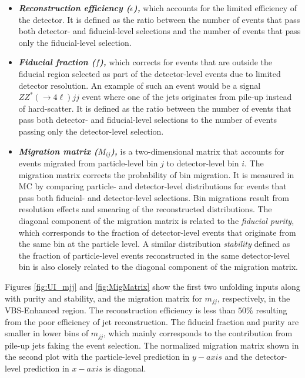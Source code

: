 \begin{itemize}
    \item{\textit{\textbf{Reconstruction efficiency ($\epsilon$),}} which accounts for the limited efficiency of the detector. It is defined as the ratio between the number of events that pass both detector- and fiducial-level selections and the number of events that pass only the fiducial-level selection. }
    
    \item{\textit{\textbf{Fiducial fraction ($f$),}} which corrects for events that are outside the fiducial region selected as part of the detector-level events due to limited detector resolution. An example of such an event would be a signal $ZZ^*(\rightarrow 4\ell) jj$ event where one of the jets originates from pile-up instead of hard-scatter. It is defined as the ratio between the number of events that pass both detector- and fiducial-level selections to the number of events passing only the detector-level selection. }
    
    \item{\textit{\textbf{Migration matrix ($M_{ij}$),}} is a two-dimensional matrix that accounts for events migrated from particle-level bin $j$ to detector-level bin $i$. The migration matrix corrects the probability of bin migration. It is measured in MC by comparing particle- and detector-level distributions for events that pass both fiducial- and detector-level selections. Bin migrations result from resolution effects and smearing of the reconstructed distributions. The diagonal component of the migration matrix is related to the \textit{fiducial purity}, which corresponds to the fraction of detector-level events that originate from the same bin at the particle level. A similar distribution \textit{stability} defined as the fraction of particle-level events reconstructed in the same detector-level bin is also closely related to the diagonal component of the migration matrix. }
\end{itemize}

Figures \ref{fig:UI_mjj} and \ref{fig:MigMatrix} show the first two unfolding inputs along with purity and stability, and the migration matrix for $m_{jj}$, respectively, in the VBS-Enhanced region. The reconstruction efficiency is less than $50\%$ resulting from the poor efficiency of jet reconstruction. The fiducial fraction and purity are smaller in lower bins of $m_{jj}$, which mainly corresponds to the contribution from pile-up jets faking the event selection. The normalized migration matrix shown in the second plot with the particle-level prediction in $y-axis$ and the detector-level prediction in $x-axis$ is diagonal.

